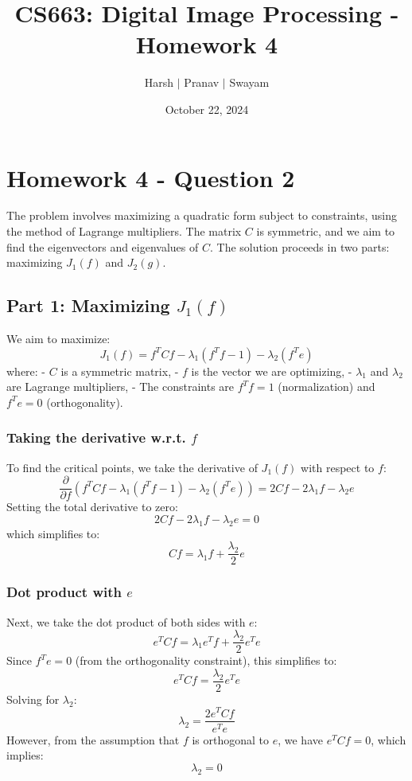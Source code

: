 \documentclass{article}
\title{CS663: Digital Image Processing - Homework 4}
\author{Harsh $\vert$ Pranav $\vert$ Swayam}
\date{October 22, 2024}
\begin{document}
\maketitle
\flushleft
\section*{Homework 4 - Question 2}

The problem involves maximizing a quadratic form subject to constraints, using the method of Lagrange multipliers. The matrix $C$ is symmetric, and we aim to find the eigenvectors and eigenvalues of $C$. The solution proceeds in two parts: maximizing $J_1(f)$ and $J_2(g)$.

\subsection*{Part 1: Maximizing $J_1(f)$}
We aim to maximize:
\[
J_1(f) = f^T C f - \lambda_1 (f^T f - 1) - \lambda_2 (f^T e)
\]
where:
- $C$ is a symmetric matrix,
- $f$ is the vector we are optimizing,
- $\lambda_1$ and $\lambda_2$ are Lagrange multipliers,
- The constraints are $f^T f = 1$ (normalization) and $f^T e = 0$ (orthogonality).

\subsubsection*{Taking the derivative w.r.t. $f$}

To find the critical points, we take the derivative of $J_1(f)$ with respect to $f$:
\[
\frac{\partial}{\partial f} (f^T C f - \lambda_1 (f^T f - 1) - \lambda_2 (f^T e)) = 2 C f - 2 \lambda_1 f - \lambda_2 e 
\]
Setting the total derivative to zero:
\[
2 C f - 2 \lambda_1 f - \lambda_2 e = 0
\]
which simplifies to:
\[
C f = \lambda_1 f + \frac{\lambda_2}{2} e
\]

\subsubsection*{Dot product with $e$}

Next, we take the dot product of both sides with $e$:
\[
e^T C f = \lambda_1 e^T f + \frac{\lambda_2}{2} e^T e
\]
Since $f^T e = 0$ (from the orthogonality constraint), this simplifies to:
\[
e^T C f = \frac{\lambda_2}{2} e^T e
\]
Solving for $\lambda_2$:
\[
\lambda_2 = \frac{2 e^T C f}{e^T e}
\]
However, from the assumption that $f$ is orthogonal to $e$, we have $e^T C f = 0$, which implies:
\[
\lambda_2 = 0
\]
\end{document}

